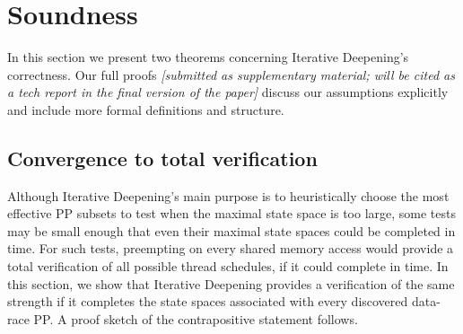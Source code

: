 \section{Soundness}
\label{sec:soundness}

In this section we present two theorems concerning Iterative Deepening's correctness.
Our full proofs
{\em [submitted as supplementary material; will be cited as a tech report in the final version of the paper]}
discuss our assumptions explicitly and include more formal definitions and structure.


\renewcommand\proofname{Proof Sketch}


\subsection{Convergence to total verification}
\label{sec:totalverif}

Although Iterative Deepening's main purpose is to heuristically choose the most effective PP subsets to test
when the maximal state space is too large,
some tests may be small enough that even their maximal state spaces could be completed in time.
For such tests, preempting on every shared memory access \cite{spin,inspect} would provide a total verification of all possible thread schedules, if it could complete in time.
In this section, we show that Iterative Deepening provides a verification of the same strength if it completes the state spaces associated with every discovered data-race PP.
A proof sketch of the contrapositive statement follows.

